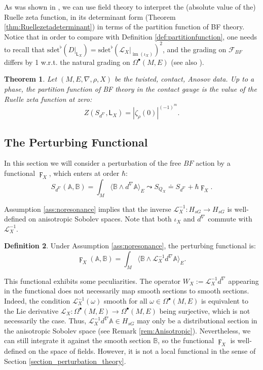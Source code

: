 \documentclass[reqno]{amsart}
\newtheorem{thm}{Theorem}[section]
\theoremstyle{definition}
\newtheorem{defn}[thm]{Definition}
\theoremstyle{remark}
\newcommand{\A}{\mathbb{A}}
\newcommand{\B}{\mathbb{B}}
\renewcommand{\d}{d^\nabla}
\newcommand{\F}{\mathcal{F}}
\newcommand{\h}{\hbar}
\newcommand{\sfL}{\mathsf{L}}
\renewcommand{\L}{\mathcal{L}}
\newcommand{\sdet}{\mathrm{sdet}^\flat}
\DeclareMathOperator{\im}{im}
\begin{document}
As was shown in \cite{hadfield_kandel_schiavina}, we can use field theory to interpret the (absolute value of the) Ruelle zeta function, in its determinant form (Theorem \ref{thm:Ruellezetadeterminant}) in terms of the partition function of BF theory. Notice that in order to compare with Definition \ref{def:partitionfunction}, one needs to recall that $\sdet(D\vert_{\sfL_X}) = \sdet(\L_X\vert_{\im(\iota_X)})^2$, and the grading on $\F_{BF}$ differs by 1 w.r.t. the natural grading on $\Omega^\bullet(M,E)$ (see also \cite[Remarks 11 and 12]{hadfield_kandel_schiavina}).

\begin{thm}\label{thm:ruellezetazeroPF}
    Let $(M,E,\nabla,\rho,X)$ be the twisted, contact, Anosov data. Up to a phase, the partition function of BF theory in the contact gauge is the value of the Ruelle zeta function at zero:
    \begin{equation}
        Z(S_{\d},\mathsf{L}_X) = |\zeta_\rho(0)|^{(-1)^m}.
    \end{equation}
\end{thm}


\subsection{The Perturbing Functional}\label{sec:perturbingfunctional}

In this section we will consider a perturbation of the free $BF$ action by a functional $\digamma_X$, which enters at order $\h$:
$$S_{\d}(\A,\B) = \int_M \langle\B\wedge\d\A\rangle_E \leadsto S_{Q_X} \doteq S_{\d} + \hbar \digamma_X.$$


\begin{rmk}
    Assumption \ref{ass:noresonance} implies that the inverse $\L_X^{-1}: H_{sG} \to H_{sG}$ is well-defined on anisotropic Sobolev spaces. Note that both $\iota_X$ and $\d$ commute with $\L_X^{-1}$. 
\end{rmk}

\begin{defn}
Under Assumption \ref{ass:noresonance}, the perturbing functional is:
\begin{equation}
\label{interaction_term}
    \digamma_X(\A,\B) = \int_M \langle\B\wedge\L_X^{-1}\d\A\rangle_E.
\end{equation}
\end{defn}
This functional exhibits some peculiarities. The operator $W_X:= \L_{X}^{-1}\d$ appearing in the functional does not necessarily map smooth sections to smooth sections. Indeed, the condition $\L_X^{-1}(\omega)$ smooth for all $\omega \in \Omega^\bullet(M,E)$ is equivalent to the Lie derivative $\L_X: \Omega^\bullet(M,E)\to \Omega^\bullet(M,E)$ being surjective, which is not necessarily the case.
Thus, $\L_X^{-1}\d\A \in H_{sG}$ may only be a distributional section in the anisotropic Sobolev space (see Remark \ref{rem:Anisotropic}). Nevertheless, we can still integrate it against the smooth section $\B$, so the functional $\digamma_X$ is well-defined on the space of fields. However, it is not a local functional in the sense of Section \ref{section_perturbation_theory}. 
\end{document}
